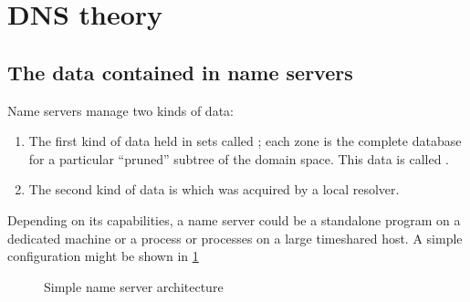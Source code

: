 \section{DNS theory}

\subsection{The data contained in name servers}


Name servers manage two kinds of data:

\begin{enumerate}
\item The first kind of data held in sets called ; each zone is the
  complete database for a particular ``pruned'' subtree of the domain space.
  This data is called . 
\item The second kind of data is  which was acquired by a
  local resolver.
\end{enumerate}

Depending on its capabilities, a name server could be a standalone program on a
dedicated machine or a process or processes on a large timeshared host. A simple
configuration might be shown in \cref{fig:name-serv-arch}

\begin{figure}[h]
  \centering
  \caption{Simple name server architecture}
  \label{fig:name-serv-arch}
\end{figure}

